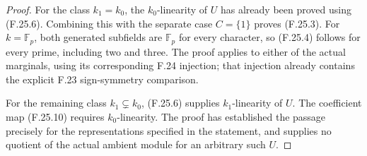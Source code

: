\begin{proof}
For the class $k_1=k_0$, the $k_0$-linearity of $U$
has already been proved using (F.25.6). Combining
this with the separate case $C=\{1\}$ proves
(F.25.3). For $k=\mathbb F_p$, both generated
subfields are $\mathbb F_p$ for every character,
so (F.25.4) follows for every prime, including two
and three. The proof applies to either of the actual
marginals, using its corresponding F.24 injection;
that injection already contains the explicit F.23
sign-symmetry comparison.

For the remaining class $k_1\subsetneq k_0$,
(F.25.6) supplies $k_1$-linearity of $U$. The
coefficient map (F.25.10) requires $k_0$-linearity.
The proof has established the passage precisely
for the representations specified in the statement,
and supplies no quotient of the actual ambient
module for an arbitrary such $U$.
\end{proof}
